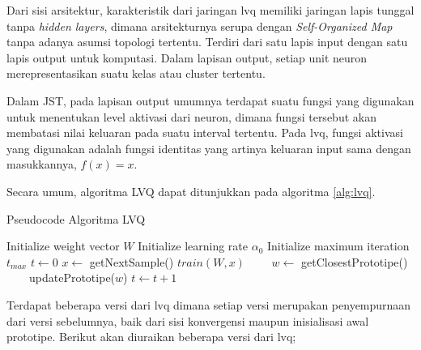 Dari sisi arsitektur, karakteristik dari jaringan \gls{lvq} memiliki jaringan
lapis tunggal tanpa \textit{hidden layers}, dimana arsitekturnya serupa dengan
\textit{Self-Organized Map} tanpa adanya asumsi topologi tertentu. Terdiri dari
satu lapis input dengan satu lapis output untuk komputasi. Dalam lapisan output,
setiap unit neuron merepresentasikan suatu kelas atau cluster tertentu.

Dalam JST, pada lapisan output umumnya terdapat suatu fungsi yang digunakan
untuk menentukan level aktivasi dari neuron, dimana fungsi tersebut akan
membatasi nilai keluaran pada suatu interval tertentu. Pada \gls{lvq}, fungsi
aktivasi yang digunakan adalah fungsi identitas yang artinya keluaran input sama
dengan masukkannya, $f(x) = x$.

\noindent
Secara umum, algoritma LVQ dapat ditunjukkan pada algoritma \ref{alg:lvq}.

\begin{algorithm}  
\caption{Pseudocode Algoritma LVQ}          
\label{alg:lvq}                           
\begin{algorithmic}                    %
	\STATE Initialize weight vector $W$
	\STATE Initialize learning rate $\alpha_0$
	\STATE Initialize maximum iteration $t_{max}$
	\STATE $t \leftarrow 0$
		\STATE $x \leftarrow $ getNextSample()
		\STATE $train(W, x)$
		\STATE $\qquad $$w \leftarrow $ getClosestPrototipe()
		\STATE $\qquad $updatePrototipe($w$)
		\STATE $t \leftarrow t + 1$
	\ENDWHILE
\end{algorithmic}
\end{algorithm}

Terdapat beberapa versi dari \gls{lvq} dimana setiap versi merupakan
penyempurnaan dari versi sebelumnya, baik dari sisi konvergensi 
maupun inisialisasi awal prototipe. Berikut akan diuraikan beberapa versi
dari \gls{lvq};

